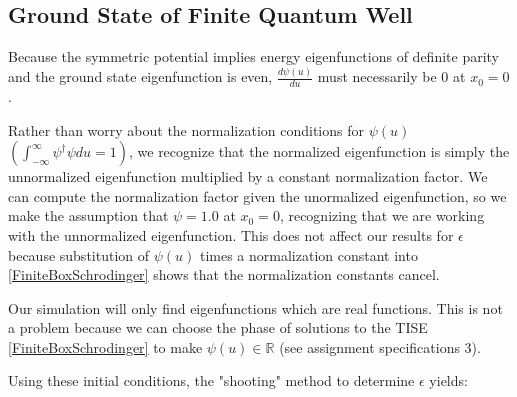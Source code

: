 \documentclass{article}
\begin{document}
\subsection{Ground State of Finite Quantum Well} 
Because the symmetric potential implies energy eigenfunctions of definite
parity and the ground state eigenfunction is even, $\frac{d\psi(u)}{du}$ must
necessarily be 0 at $x_0 = 0$. 

Rather than worry about the normalization conditions for $\psi(u)$
$\left(\int_{-\infty}^{\infty}\psi^\dag\psi du = 1\right)$, we recognize that
the normalized eigenfunction is simply the unnormalized eigenfunction
multiplied by a constant normalization factor. We can compute the normalization
factor given the unormalized eigenfunction, so we make the assumption that
$\psi = 1.0$ at $x_0 = 0$, recognizing that we are working with the unnormalized
eigenfunction. This does not affect our results for $\epsilon$ because
substitution of $\psi(u)$ times a normalization constant into
\eqref{FiniteBoxSchrodinger} shows that the normalization constants cancel. 

Our simulation will only find eigenfunctions which are real functions. This is
not a problem because we can choose the phase of solutions to the TISE
\eqref{FiniteBoxSchrodinger} to make $\psi(u) \in \mathbb{R}$ (see assignment
specifications 3).

Using these initial conditions, the "shooting" method to determine $\epsilon$ yields:
\end{document}
